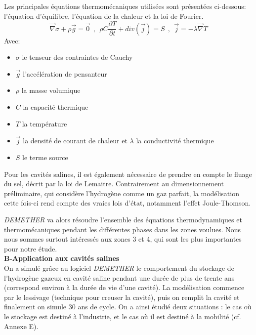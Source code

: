 \documentclass[11pt,french,a4paper]{article}
\begin{document}
\begin{multicols}{2}
\end{multicols}

 
Les principales équations thermomécaniques utilisées sont présentées ci-dessous: l'équation d'équilibre, l'équation de la chaleur et la loi de Fourier.  
 $$
 	\vec{\nabla}\sigma + \rho \vec{g} = \vec{0} \ \ , \ \
	\rho C \frac{\partial T}{\partial t} + div(\vec{j}) = S \ \ , \ \
	\vec{j} = - \lambda \vec{\nabla}T
 $$
Avec:
\begin{itemize}
\item $\sigma$ le tenseur des contraintes de Cauchy
\item $\vec{g}$ l'accélération de pensanteur
\item $\rho$ la masse volumique
\item $C$ la capacité thermique 
\item $T$ la température
\item $\vec{j}$  la densité de courant de chaleur et $\lambda$ la conductivité thermique
\item $S$ le terme source
\end{itemize}

Pour les cavités salines, il est également nécessaire de prendre en compte le fluage du sel, décrit par la loi de Lemaitre. Contrairement au dimensionnement préliminaire, qui considère l'hydrogène comme un gaz parfait, la modélisation cette fois-ci rend compte des vraies lois d'état, notamment l'effet Joule-Thomson. 

\emph{DEMETHER} va alors résoudre l’ensemble des équations thermodynamiques et thermomécaniques pendant les différentes phases dans les zones voulues. Nous nous sommes surtout intéressés aux zones 3 et 4, qui sont les plus importantes pour notre étude. \\

\textbf{B-Application aux cavités salines}\\

On a simulé grâce au logiciel \emph{DEMETHER} le comportement du stockage de l'hydrogène gazeux en cavité saline pendant une durée de plus de trente ans (correspond environ à la durée de vie d’une cavité). La modélisation commence par le lessivage (technique pour creuser la cavité), puis on remplit la cavité et finalement on simule 30 ans de cycle. On a ainsi étudié deux situations : le cas où le stockage est destiné à l’industrie, et le cas où il est destiné à la mobilité (cf. Annexe E).
\end{document}
